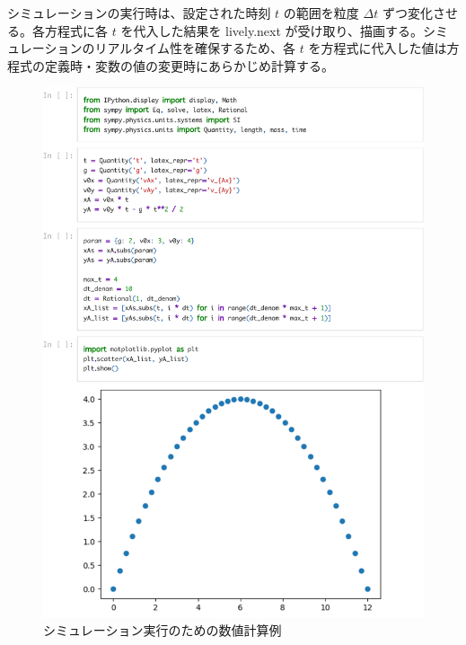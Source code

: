 シミュレーションの実行時は、設定された時刻 $t$ の範囲を粒度 $\Delta t$ ずつ変化させる。各方程式に各 $t$ を代入した結果を lively.next が受け取り、描画する。シミュレーションのリアルタイム性を確保するため、各 $t$ を方程式に代入した値は方程式の定義時・変数の値の変更時にあらかじめ計算する。

\begin{figure}[hbt]
\centering
\includegraphics[width=0.85\linewidth]{work/deltat_example-crop.pdf}
\caption{シミュレーション実行のための数値計算例} \label{deltat_exapmle}
\end{figure}

